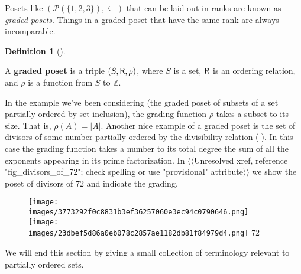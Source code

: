 \documentclass[10pt,]{book}
\newcommand{\terminology}[1]{\textbf{#1}}
\theoremstyle{plain}
\theoremstyle{definition}
\newtheorem{definition}[theorem]{Definition}
\theoremstyle{definition}
\numberwithin{equation}{section}
\newcommand{\Integers}{{\mathbb Z}}
\newcommand{\relR}{\mbox{\textsf R}}
\begin{document}
    Posets like \(({\mathcal P}(\{1,2,3\}), \subseteq)\) that can be laid out
    in ranks are known as  \emph{graded posets}. Things
    in a graded poset that have the same rank are always incomparable.
\begin{definition}[{}]\label{definition-14}

        A \terminology{graded poset} is a triple \((S, \relR, \rho)\), where \(S\) is a set,
        \(\relR\) is an ordering relation, and \(\rho\) is a function from \(S\) to \(\Integers\).
\end{definition}
\par

    In the example we've been considering (the graded poset of subsets of a set
    partially ordered by set inclusion), the grading function \(\rho\) takes a
    subset to its size. That is, \(\rho(A) = |A|\). Another nice example of
    a graded poset is the set of divisors of some number partially ordered
    by the divisibility relation (\(\mid\)). In this case the grading function
    takes a number to its total degree \textemdash{} the sum of all the exponents
    appearing in its prime factorization. In {$\langle\langle$Unresolved xref, reference "fig\_divisors\_of\_72"; check spelling or use "provisional" attribute$\rangle\rangle$}
    we show the poset of divisors of \(72\) and indicate the grading.
\leavevmode%
\begin{figure}
\centering
\texttt{[image: images/3773292f0c8831b3ef36257060e3ec94c0790646.png]}
\texttt{[image: images/23dbef5d86a0eb078c2857ae1182db81f84979d4.png]}
\(72\)\end{figure}
\par

    We will end this section by giving a small collection of terminology
    relevant to partially ordered sets.
\par
\end{document}
